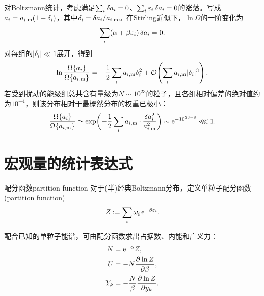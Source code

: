 对Boltzmann统计，考虑满足$\textstyle \sum_i\mathop{}\!\delta a_i = 0$、$\textstyle \sum_i\varepsilon_i\mathop{}\!\delta a_i = 0$的涨落。写成$a_i = a_{i,\mathrm m}(1 + \delta_i)$，其中$\delta_i = \mathop{}\!\delta a_i/a_{i,\mathrm m}$。在Stirling近似下，$\ln\Omega$的一阶变化为
\[
	\sum_i(\alpha + \beta\varepsilon_i)\mathop{}\!\delta a_i = 0.
\]
对每组的$|\delta_i| \ll 1$展开，得到
\begin{equation}
	\label{eq:sm-most-probable-fluctuation-weight}
	\ln\frac{\Omega\{a_i\}}{\Omega\{a_{i,\mathrm m}\}}
	= -\frac12\sum_i a_{i,\mathrm m}\delta_i^2
	+ \mathcal{O}\!\left(\sum_i a_{i,\mathrm m}|\delta_i|^3\right).
\end{equation}
若受到扰动的能级组总共含有量级为$N \sim 10^{23}$的粒子，且各组相对偏差的绝对值约为$10^{-4}$，则该分布相对于最概然分布的权重已极小：
\[
	\frac{\Omega\{a_i\}}{\Omega\{a_{i,\mathrm m}\}} \simeq \exp\biggl(-\frac12\sum_ia_{i,\mathrm m} \cdot \frac{\mathop{}\!\delta a_i^2}{a_{i,\mathrm m}^2}\biggr) \sim \mathop{}\!\mathrm{e}^{-10^{23-8}}\lll 1.
\]

\section{宏观量的统计表达式}

\begin{definition}{配分函数}{partition function}
	对于(半)经典Boltzmann分布，定义单粒子配分函数(partition function)
	\begin{equation}
		Z := \sum_i\omega_i\mathop{}\!\mathrm{e}^{-\beta\varepsilon_i}.
	\end{equation}
\end{definition}

\begin{corollary}
	配合已知的单粒子能谱，可由配分函数求出占据数、内能和广义力：
	\begin{subequations}
		\begin{align}
			N &= \mathop{}\!\mathrm{e}^{-\alpha}Z,\\
			\label{eqn:U=-NplnZ}
			U &= -N\frac{\partial^{}\ln Z}{\partial{\beta}^{}},\\
			\label{eqn:Y=-NplnZ/beta}
			Y_k &= -\frac N\beta\frac{\partial^{}\ln Z}{\partial{y_k}^{}}.
		\end{align}
	\end{subequations}
\end{corollary}

